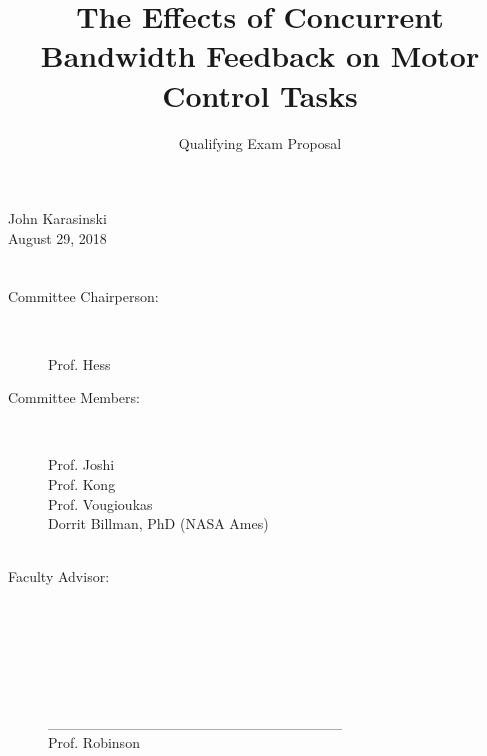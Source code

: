 \documentclass{paper}
\title{The Effects of Concurrent Bandwidth Feedback on Motor Control Tasks}
\subtitle{Qualifying Exam Proposal}
\begin{document}
\maketitle

\noindent John Karasinski \\
August 29, 2018

\section*{}%
\begin{description}
  \item[Committee Chairperson:] \begin{tabular}{c} \\ \end{tabular}\\
    Prof. Hess
  \item[Committee Members:] \begin{tabular}{c} \\ \end{tabular}\\
    Prof. Joshi \\
    Prof. Kong \\
    Prof. Vougioukas \\
    Dorrit Billman, PhD (NASA Ames) \\
    \\
  \item[Faculty Advisor:] \begin{tabular}{c} \\ \end{tabular}\\
    \\
    \\
    \\
    \\
    ____________________________\\
    Prof. Robinson
\end{description}
\end{document}
